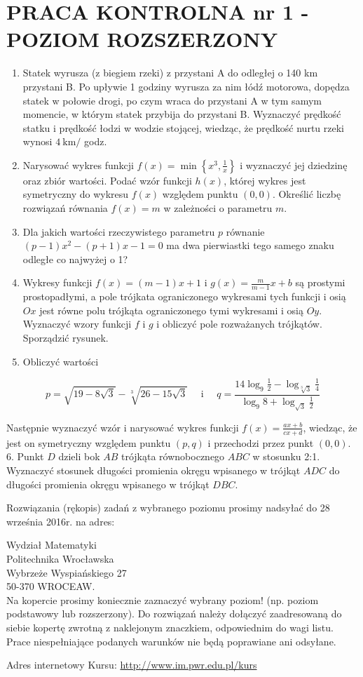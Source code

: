 \documentclass[10pt]{article}
\begin{document}
\section*{PRACA KONTROLNA nr 1 - POZIOM ROZSZERZONY}
\begin{enumerate}
  \item Statek wyrusza (z biegiem rzeki) z przystani A do odległej o 140 km przystani B. Po upływie 1 godziny wyrusza za nim łódź motorowa, dopędza statek w połowie drogi, po czym wraca do przystani A w tym samym momencie, w którym statek przybija do przystani B. Wyznaczyć prędkość statku i prędkość łodzi w wodzie stojącej, wiedząc, że prędkość nurtu rzeki wynosi $4 \mathrm{~km} /$ godz.
  \item Narysować wykres funkcji $f(x)=\min \left\{x^{3}, \frac{1}{x}\right\}$ i wyznaczyć jej dziedzinę oraz zbiór wartości. Podać wzór funkcji $h(x)$, której wykres jest symetryczny do wykresu $f(x)$ względem punktu $(0,0)$. Określić liczbę rozwiązań równania $f(x)=m$ w zależności o parametru $m$.
  \item Dla jakich wartości rzeczywistego parametru $p$ równanie $(p-1) x^{2}-(p+1) x-1=0$ ma dwa pierwiastki tego samego znaku odległe co najwyżej o 1?
  \item Wykresy funkcji $f(x)=(m-1) x+1$ i $g(x)=\frac{m}{m-1} x+b$ są prostymi prostopadłymi, a pole trójkata ograniczonego wykresami tych funkcji i osią $O x$ jest równe polu trójkąta ograniczonego tymi wykresami i osią $O y$. Wyznaczyć wzory funkcji $f$ i $g$ i obliczyć pole rozważanych trójkątów. Sporządzić rysunek.
  \item Obliczyć wartości
\end{enumerate}

$$
p=\sqrt{19-8 \sqrt{3}}-\sqrt[3]{26-15 \sqrt{3}} \quad \text { i } \quad q=\frac{14 \log _{9} \frac{1}{2}-\log _{\sqrt[3]{3}} \frac{1}{4}}{\log _{9} 8+\log _{\sqrt{3}} \frac{1}{2}}
$$

Następnie wyznaczyć wzór i narysować wykres funkcji $f(x)=\frac{a x+b}{c x+d}$, wiedząc, że jest on symetryczny względem punktu $(p, q)$ i przechodzi przez punkt $(0,0)$.\\
6. Punkt $D$ dzieli bok $A B$ trójkąta równobocznego $A B C$ w stosunku 2:1. Wyznaczyć stosunek długości promienia okręgu wpisanego w trójkąt $A D C$ do długości promienia okręgu wpisanego w trójkąt $D B C$.

Rozwiązania (rękopis) zadań z wybranego poziomu prosimy nadsyłać do 28 września 2016r. na adres:

Wydział Matematyki\\
Politechnika Wrocławska\\
Wybrzeże Wyspiańskiego 27\\
50-370 WROCEAW.\\
Na kopercie prosimy koniecznie zaznaczyć wybrany poziom! (np. poziom podstawowy lub rozszerzony). Do rozwiązań należy dołączyć zaadresowaną do siebie kopertę zwrotną z naklejonym znaczkiem, odpowiednim do wagi listu. Prace niespełniające podanych warunków nie będą poprawiane ani odsyłane.

Adres internetowy Kursu: \href{http://www.im.pwr.edu.pl/kurs}{http://www.im.pwr.edu.pl/kurs}
\end{document}
